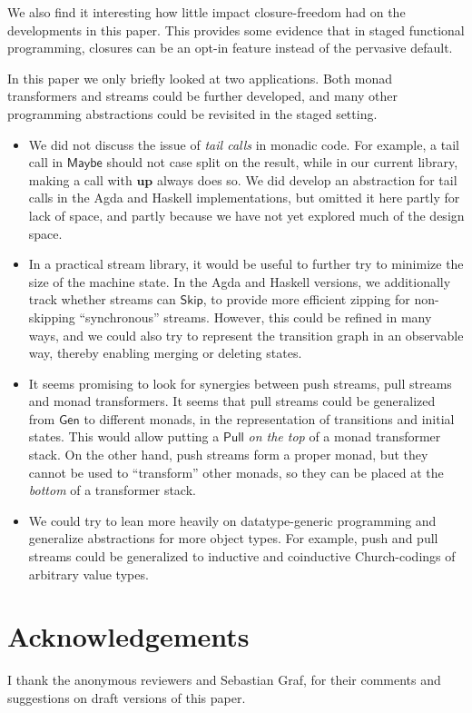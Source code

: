 \documentclass[acmsmall,screen]{acmart}
\newcommand{\msf}[1]{{\mathsf{#1}}}
\newcommand{\mbf}[1]{{\mathbf{#1}}}
\newcommand{\Maybe}{\msf{Maybe}}
\theoremstyle{remark}
\newcommand{\mup}{\mbf{up}}
\newcommand{\Gen}{\msf{Gen}}
\newcommand{\Skip}{\msf{Skip}}
\newcommand{\Pull}{\msf{Pull}}
\begin{document}
We also find it interesting how little impact closure-freedom had on the
developments in this paper. This provides some evidence that in staged
functional programming, closures can be an opt-in feature instead of the
pervasive default.

In this paper we only briefly looked at two applications. Both monad
transformers and streams could be further developed, and many other programming
abstractions could be revisited in the staged setting.
\begin{itemize}
\item
     We did not discuss the issue of \emph{tail calls} in monadic code. For
     example, a tail call in $\Maybe$ should not case split on the result, while
     in our current library, making a call with $\mup$ always does so. We did
     develop an abstraction for tail calls in the Agda and Haskell
     implementations, but omitted it here partly for lack of space, and partly
     because we have not yet explored much of the design space.

\item In a practical stream library, it would be useful to further try to
     minimize the size of the machine state. In the Agda and Haskell versions, we
     additionally track whether streams can $\Skip$, to provide more efficient
     zipping for non-skipping ``synchronous'' streams. However, this could be
     refined in many ways, and we could also try to represent the transition
     graph in an observable way, thereby enabling merging or deleting states.

\item It seems promising to look for synergies between push streams, pull streams
     and monad transformers. It seems that pull streams could be generalized from
     $\Gen$ to different monads, in the representation of transitions and initial
     states. This would allow putting a $\Pull$ \emph{on the top} of a monad
     transformer stack. On the other hand, push streams form a proper monad, but
     they cannot be used to ``transform'' other monads, so they can be placed
     at the \emph{bottom} of a transformer stack.
\item We could try to lean more heavily on datatype-generic programming and
     generalize abstractions for more object types. For example, push and pull
     streams could be generalized to inductive and coinductive Church-codings of
     arbitrary value types.
\end{itemize}

\section*{Acknowledgements}
I thank the anonymous reviewers and Sebastian Graf, for their comments and suggestions
on draft versions of this paper.
\end{document}
